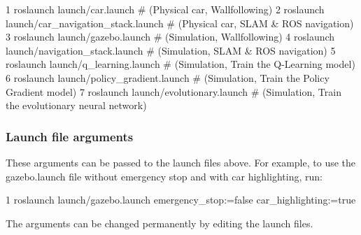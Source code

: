 \begin{DoxyCode}
1 roslaunch launch/car.launch                   # (Physical car, Wallfollowing)
2 roslaunch launch/car\_navigation\_stack.launch  # (Physical car, SLAM & ROS navigation)
3 roslaunch launch/gazebo.launch                # (Simulation, Wallfollowing)
4 roslaunch launch/navigation\_stack.launch      # (Simulation, SLAM & ROS navigation)
5 roslaunch launch/q\_learning.launch            # (Simulation, Train the Q-Learning model)
6 roslaunch launch/policy\_gradient.launch       # (Simulation, Train the Policy Gradient model)
7 roslaunch launch/evolutionary.launch          # (Simulation, Train the evolutionary neural network)
\end{DoxyCode}


\subsubsection*{Launch file arguments}

These arguments can be passed to the launch files above. For example, to use the {\ttfamily gazebo.\+launch} file without emergency stop and with car highlighting, run\+: 
\begin{DoxyCode}
1 roslaunch launch/gazebo.launch emergency\_stop:=false car\_highlighting:=true
\end{DoxyCode}
 The arguments can be changed permanently by editing the launch files.

